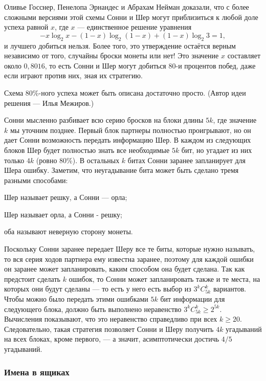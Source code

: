 Оливье Госснер, Пенелопа Эрнандес и Абрахам Нейман \cite{32} доказали, что с более сложными версиями этой схемы Сонни и Шер могут приблизиться к любой доле успеха равной $x$, где $x$ --- единственное решение уравнения
\[-x \log_2 x - (1 - x) \log_2 (1 - x) + (1 - x) \log_2 3 = 1,\]
и лучшего добиться нельзя.
Более того, это утверждение остаётся верным независимо от того, случайны броски монеты или нет!
Это значение $x$ составляет около $0{,}8016$, то есть Сонни и Шер могут добиться  $80$-и процентов побед, даже если играют против них, зная их стратегию.

\begin{addedbytheeditors}
Схема 80\%-ного успеха может быть описана достаточно просто. (Автор идеи решения --- Илья Межиров.)

Сонни мысленно разбивает всю серию бросков на блоки длины $5k$, где значение $k$ мы уточним позднее.
Первый блок партнеры полностью проигрывают, но он дает Сонни возможность передать информацию Шер.
В каждом из следующих блоков Шер будет полностью знать все необходимые $5k$ бит, но угадает из них только $4k$ (ровно 80\%).
В остальных $k$ битах Сонни заранее запланирует для Шера ошибку. Заметим, что неугадывание бита может быть сделано
тремя разными способами: \begin{\itemize}
\item Шер называет решку, а Сонни --- орла;
\item Шер называет орла, а Сонни - решку;
\item оба называют неверную сторону монеты.
\end{\itemize}
Поскольку Сонни заранее передает Шеру все те биты, которые нужно называть, то вся серия ходов партнера ему известна заранее, поэтому 
для каждой ошибки он заранее может запланировать, каким способом она будет сделана.
Так как предстоит сделать $k$ ошибок, то Сонни может запланировать также и те места, на которых они будут сделаны --- то есть
у него есть выбор из $3^k C_{5k}^k$ вариантов. Чтобы можно было передать этими ошибками $5k$ бит информации для следующего блока,
должно быть выполнено неравенство $3^k C_{5k}^k \ge 2^{5k}$. Вычисления показывают, что это неравенство справедливо при всех $k\ge 20$.
Следовательно, такая стратегия позволяет Сонни и Шеру получить $4k$ угадываний на всех блоках, кроме первого, --- а значит,
асимптотически достичь $4/5$ угадываний.
\end{addedbytheeditors}


\subsubsection*{Имена в ящиках}


